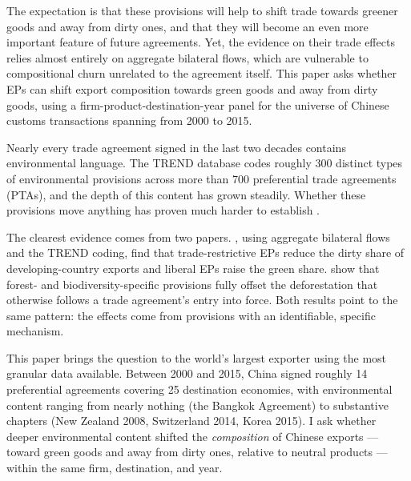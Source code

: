 \documentclass[12pt]{article}
\begin{document}
The expectation is that these provisions will help to shift trade towards greener goods and away from dirty ones, and that they will become an even more important feature of future agreements. Yet, the evidence on their trade effects relies almost entirely on aggregate bilateral flows, which are vulnerable to compositional churn unrelated to the agreement itself. This paper asks whether EPs can shift export composition towards green goods and away from dirty goods, using a firm-product-destination-year panel for the universe of Chinese customs transactions spanning from 2000 to 2015.

Nearly every trade agreement signed in the last two decades contains environmental
language. The TREND database \citep{morin2018} codes roughly 300 distinct types of
environmental provisions across more than 700 preferential trade agreements (PTAs), and
the depth of this content has grown steadily. Whether these provisions move anything
has proven much harder to establish \citep{copeland2022}.

The clearest evidence comes from two papers. \citet{brandi2020}, using
aggregate bilateral flows and the TREND coding, find that trade-restrictive EPs reduce the
dirty share of developing-country exports and liberal EPs raise the green share.
\citet{abman2024} show that forest- and biodiversity-specific provisions fully offset the
deforestation that otherwise follows a trade agreement's entry into force. Both results
point to the same pattern: the effects come from provisions with an identifiable, specific
mechanism.

This paper brings the question to the world's largest exporter using the most granular
data available. Between 2000 and 2015, China signed roughly 14 preferential agreements
covering 25 destination economies, with environmental content ranging from nearly nothing
(the Bangkok Agreement) to substantive chapters (New Zealand 2008, Switzerland 2014,
Korea 2015). I ask whether deeper environmental content shifted the \emph{composition} of
Chinese exports --- toward green goods and away from dirty ones, relative to neutral
products --- within the same firm, destination, and year.
\end{document}
